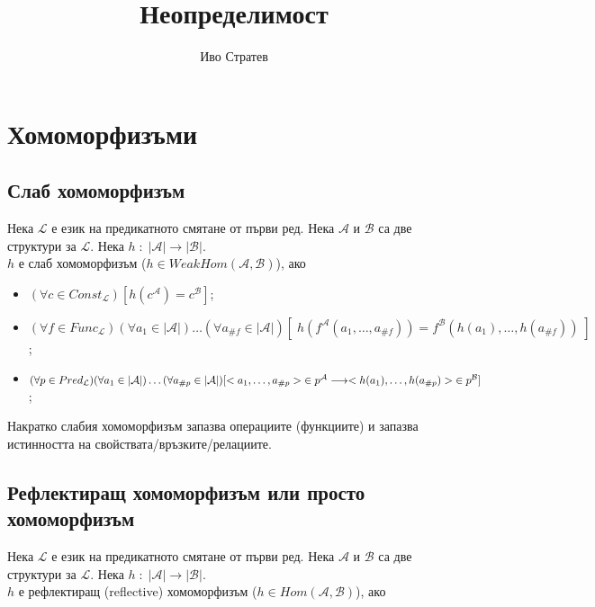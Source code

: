\documentclass{article}[12pt]
\title{Неопределимост}
\author{Иво Стратев}
\newcommand{\Lang}{\mathcal{L}}
\begin{document}
\maketitle

\tableofcontents

\pagebreak

\section{Хомоморфизъми}

\subsection{Слаб хомоморфизъм}

Нека \(\Lang\) е език на предикатното смятане от първи ред.
Нека \(\mathcal{A}\) и \(\mathcal{B}\) са две структури за \(\Lang\).
Нека \(h \; : \; |\mathcal{A}| \to |\mathcal{B}|\). \\
\(h\) е слаб хомоморфизъм (\(h \in WeakHom(\mathcal{A}, \mathcal{B})\)),
ако

\begin{itemize}
\item \((\forall c \in Const_\Lang)[h(c^\mathcal{A}) = c^\mathcal{B}]\);
\item \((\forall f \in Func_\Lang)(\forall a_1 \in |\mathcal{A}|)\dots(\forall a_{\#f} \in |\mathcal{A}|)
[\; h(f^\mathcal{A}(a_1, \dots, a_{\#f})) = f^\mathcal{B}(h(a_1), \dots, h(a_{\#f}))\;]\);
\item \((\forall p \in Pred_\Lang)(\forall a_1 \in |\mathcal{A}|)\dots(\forall a_{\#p} \in |\mathcal{A}|) \newline
[<a_1, \dots, a_{\#p}> \; \in p^\mathcal{A} \longrightarrow <h(a_1), \dots, h(a_{\#p})> \; \in p^\mathcal{B}]\);
\end{itemize}

Накратко слабия хомоморфизъм запазва операциите (функциите) и запазва истинността на свойствата/връзките/релациите.

\subsection{Рефлектиращ хомоморфизъм или просто хомоморфизъм}

Нека \(\Lang\) е език на предикатното смятане от първи ред.
Нека \(\mathcal{A}\) и \(\mathcal{B}\) са две структури за \(\Lang\).
Нека \(h \; : \; |\mathcal{A}| \to |\mathcal{B}|\). \\
\(h\) е рефлектиращ (reflective) хомоморфизъм (\(h \in Hom(\mathcal{A}, \mathcal{B})\)),
ако
\end{document}
